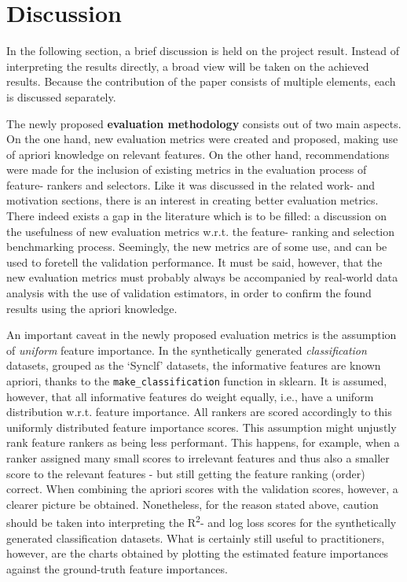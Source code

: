 \documentclass[../main.tex]{subfiles}
\begin{document}
\section{Discussion}\label{section:discussion}
In the following section, a brief discussion is held on the project result. Instead of interpreting the results directly, a broad view will be taken on the achieved results. Because the contribution of the paper consists of multiple elements, each is discussed separately.

The newly proposed \textbf{evaluation methodology} consists out of two main aspects. On the one hand, new evaluation metrics were created and proposed, making use of \gls{apriori} knowledge on relevant features. On the other hand, recommendations were made for the inclusion of existing metrics in the evaluation process of feature- rankers and selectors. Like it was discussed in the related work- and motivation sections, there is an interest in creating better evaluation metrics. There indeed exists a gap in the literature which is to be filled: a discussion on the usefulness of new evaluation metrics w.r.t. the feature- ranking and selection benchmarking process. Seemingly, the new metrics are of some use, and can be used to foretell the validation performance. It must be said, however, that the new evaluation metrics must probably always be accompanied by real-world data analysis with the use of validation estimators, in order to confirm the found results using the \gls{apriori} knowledge.

An important caveat in the newly proposed evaluation metrics is the assumption of \textit{uniform} feature importance. In the synthetically generated \textit{classification} datasets, grouped as the `Synclf' datasets, the informative features are known \gls{apriori}, thanks to the \texttt{make\_classification} function in sklearn. It is assumed, however, that all informative features do weight equally, i.e., have a uniform distribution w.r.t. feature importance. All rankers are scored accordingly to this uniformly distributed feature importance scores. This assumption might unjustly rank feature rankers as being less performant. This happens, for example, when a ranker assigned many small scores to irrelevant features and thus also a smaller score to the relevant features - but still getting the feature ranking (order) correct. When combining the \gls{apriori} scores with the validation scores, however, a clearer picture be obtained. Nonetheless, for the reason stated above, caution should be taken into interpreting the R\textsuperscript{2}- and log loss scores for the synthetically generated classification datasets. What is certainly still useful to practitioners, however, are the charts obtained by plotting the estimated feature importances against the ground-truth feature importances.
\end{document}
